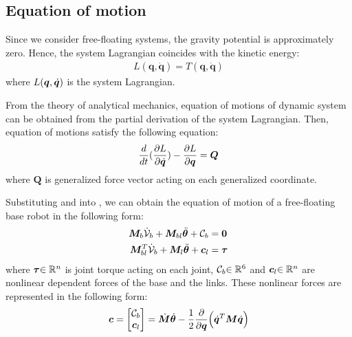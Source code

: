 \subsection{Equation of motion}
Since we consider free-floating systems,
the gravity potential is approximately zero.
Hence, the system Lagrangian coincides with the kinetic energy:
%
\begin{align}
  L(\bm{q},\dot{\bm{q}}) = T(\bm{q},\dot{\bm{q}})\label{eq:LAGRANGIAN}
\end{align}
%
where $L(\bm{q},\dot{\bm{q}})$ is the system Lagrangian.

From the theory of analytical mechanics,
equation of motions of dynamic system can be obtained
from the partial derivation of the system Lagrangian.
Then, equation of motions satisfy the following equation:
%
\begin{align}
  \frac{d}{dt}({\frac{\partial L}{\partial \dot{\bm{q}}}}) - {\frac{\partial L}{\partial \bm{q}}} = \bm{Q}\label{eq:LAGRANGE_EQ}
\end{align}
%
where $\bm{Q}$ is generalized force vector acting on each generalized coordinate.

Substituting  and  into ,
we can obtain the equation of motion of a free-floating base robot in the following form:
%
\begin{align}
  \bm{M}_{b}\dot{\mathcal{V}}_{b} + \bm{M}_{bl}{\ddot{\bm{\theta}}} + \mathcal{C}_{b} &= \bm{0}\label{eq:EOM_BASE}\\
  \bm{M}_{bl}^{T}\dot{\mathcal{V}}_{b} + \bm{M}_{l}{\ddot{\bm{\theta}}} + \bm{c}_{l} &= \bm{\tau}\label{eq:EOM_LINK}
\end{align}
%
where $\bm{\tau}{\in\mathbb{R}^{n}}$ is joint torque acting on each joint,
$\mathcal{C}_{b}{\in\mathbb{R}^{6}}$ and $\bm{c}_{l}{\in\mathbb{R}^{n}}$ are nonlinear
dependent forces of the base and the links.
These nonlinear forces are represented in the following form:
%
\begin{align}
  \bm{c} = {\begin{bmatrix} \mathcal{C}_{b} \\ \bm{c}_{l} \end{bmatrix}} =
  \dot{\bm{M}}{\dot{\bm{\theta}}} - \frac{1}{2}{\frac{\partial }{\partial \bm{q}}}\Big(\dot{\bm{q}}^{T}\bm{M}\dot{\bm{q}}\Big)
\end{align}
%

